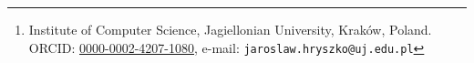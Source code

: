 \author{
Jarosław Hryszko\thanks{Institute of Computer Science, Jagiellonian University, Kraków, Poland. ORCID: \href{https://orcid.org/0000-0002-4207-1080}{0000-0002-4207-1080}, e-mail: \texttt{jaroslaw.hryszko@uj.edu.pl}}
}